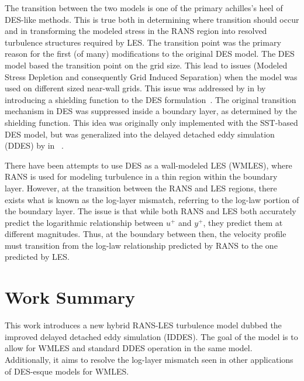 \documentclass{ucb}
\begin{document}
The transition between the two models is one of the primary achilles's heel of DES-like methods. This is true both in determining where transition should occur and in transforming the modeled stress in the RANS region into resolved turbulence structures required by LES. The transition point was the primary reason for the first (of many) modifications to the original DES model. The DES model based the transition point on the grid size. This lead to issues (Modeled Stress Depletion and consequently Grid Induced Separation) when the model was used on different sized near-wall grids. This issue was addressed by \citeauthor{Menter2002} in  by introducing a shielding function to the DES formulation~\cite{Menter2002}. The original transition mechanism in DES was suppressed inside a boundary layer, as determined by the shielding function. This idea was originally only implemented with the SST-based DES model, but was generalized into the delayed detached eddy simulation (DDES) by \citeauthor{Spalart2006} in ~\cite{Spalart2006}.

There have been attempts to use DES as a wall-modeled LES (WMLES), where RANS is used for modeling turbulence in a thin region within the boundary layer. However, at the transition between the RANS and LES regions, there exists what is known as the log-layer mismatch, referring to the log-law portion of the boundary layer. The issue is that while both RANS and LES both accurately predict the logarithmic relationship between \(u^+\) and \(y^+\), they predict them at different magnitudes. Thus, at the boundary between then, the velocity profile must transition from the log-law relationship predicted by RANS to the one predicted by LES.

\section{Work Summary}
This work introduces a new hybrid RANS-LES turbulence model dubbed the improved delayed detached eddy simulation (IDDES). The goal of the model is to allow for WMLES and standard DDES operation in the same model. Additionally, it aims to resolve the log-layer mismatch seen in other applications of DES-esque models for WMLES.
\end{document}
